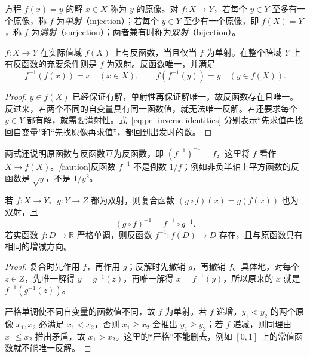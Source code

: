 \begin{definition}
\label{def:pei-injective-surjective}
方程 $f(x)=y$ 的解 $x\in X$ 称为 $y$ 的原像。对 $f:X\to Y$，若每个 $y\in Y$ 至多有一个原像，称 $f$ 为\emph{单射}（injection）；若每个 $y\in Y$ 至少有一个原像，即 $f(X)=Y$，称 $f$ 为\emph{满射}（surjection）；两者兼有时称为\emph{双射}（bijection）。
\end{definition}

\begin{proposition}[反函数的存在条件]
\label{prop:pei-inverse-existence}
$f:X\to Y$ 在实际值域 $f(X)$ 上有反函数，当且仅当 $f$ 为单射。在整个陪域 $Y$ 上有反函数的充要条件则是 $f$ 为双射。反函数唯一，并满足
\begin{equation}
    f^{-1}(f(x))=x\quad(x\in X),\qquad
    f(f^{-1}(y))=y\quad(y\in f(X)).
    \label{eq:pei-inverse-identities}
\end{equation}
\end{proposition}
\begin{proof}
$y\in f(X)$ 已经保证有解，单射性再保证解唯一，故反函数存在且唯一。反过来，若两个不同的自变量具有同一函数值，就无法唯一反解。若还要求每个 $y\in Y$ 都有解，就需要满射性。式~\eqref{eq:pei-inverse-identities} 分别表示“先求值再找回自变量”和“先找原像再求值”，都回到出发时的数。
\end{proof}

两式还说明原函数与反函数互为反函数，即 $(f^{-1})^{-1}=f$，这里将 $f$ 看作 $X\to f(X)$。\emph[caution]{反函数 $f^{-1}$ 不是倒数 $1/f$}；例如非负半轴上平方函数的反函数是 $\sqrt y$，不是 $1/y^2$。

\begin{proposition}[反函数的两个常用性质]
\label{prop:pei-composite-inverse}
若 $f:X\to Y$、$g:Y\to Z$ 都为双射，则复合函数 $(g\circ f)(x)=g(f(x))$ 也为双射，且
\begin{equation}
    (g\circ f)^{-1}=f^{-1}\circ g^{-1}.
    \label{eq:pei-composite-inverse}
\end{equation}
若实函数 $f:D\to\mathbb R$ 严格单调，则反函数 $f^{-1}:f(D)\to D$ 存在，且与原函数具有相同的增减方向。
\end{proposition}
\begin{proof}
复合时先作用 $f$，再作用 $g$；反解时先撤销 $g$，再撤销 $f$。具体地，对每个 $z\in Z$，先唯一解得 $y=g^{-1}(z)$，再唯一解得 $x=f^{-1}(y)$，所以原来的 $x$ 就是 $f^{-1}(g^{-1}(z))$。

严格单调使不同自变量的函数值不同，故 $f$ 为单射。若 $f$ 递增，$y_1<y_2$ 的两个原像 $x_1,x_2$ 必满足 $x_1<x_2$，否则 $x_1\ge x_2$ 会推出 $y_1\ge y_2$；若 $f$ 递减，则同理由 $x_1\le x_2$ 推出矛盾，故 $x_1>x_2$。这里的“严格”不能删去，例如 $[0,1]$ 上的常值函数就不能唯一反解。
\end{proof}

